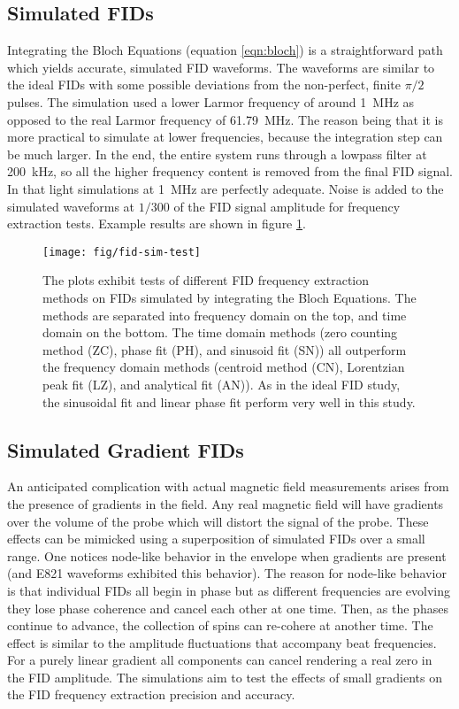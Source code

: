 \subsection{Simulated FIDs}
Integrating the Bloch Equations (equation \ref{eqn:bloch}) is a straightforward path which yields accurate, simulated FID waveforms.  The waveforms are similar to the ideal FIDs with some possible deviations from the non-perfect, finite $\pi/2$ pulses.  The simulation used a lower Larmor frequency of around \SI{1}{\MHz} as opposed to the real Larmor frequency of \SI{61.79}{\MHz}.  The reason being that it is more practical to simulate at lower frequencies, because the integration step can be much larger.  In the end, the entire system runs through a lowpass filter at \SI{200}{\kHz}, so all the higher frequency content is removed from the final FID signal.  In that light simulations at \SI{1}{\MHz} are perfectly adequate.  Noise is added to the simulated waveforms at $1/300$ of the FID signal amplitude for frequency extraction tests.  Example results are shown in figure \ref{fig:fid-sim-freq-extraction}.

\begin{figure}
\centering
\texttt{[image: fig/fid-sim-test]}
\caption{
    The plots exhibit tests of different FID frequency extraction methods on FIDs simulated by integrating the Bloch Equations.  The methods are separated into frequency domain on the top, and time domain on the bottom.  The time domain methods (zero counting method (ZC), phase fit (PH), and sinusoid fit (SN)) all outperform the frequency domain methods (centroid method (CN), Lorentzian peak fit (LZ), and analytical fit (AN)).  As in the ideal FID study, the sinusoidal fit and linear phase fit perform very well in this study.
    \label{fig:fid-sim-freq-extraction}
}
\end{figure}

\subsection{Simulated Gradient FIDs}
An anticipated complication with actual magnetic field measurements arises from the presence of gradients in the field.  Any real magnetic field will have gradients over the volume of the probe which will distort the signal of the probe.  These effects can be mimicked using a superposition of simulated FIDs over a small range.  One notices node-like behavior in the envelope when gradients are present (and E821 waveforms exhibited this behavior).  The reason for node-like behavior is that individual FIDs all begin in phase but as different frequencies are evolving they lose phase coherence and cancel each other at one time.  Then, as the phases continue to advance, the collection of spins can re-cohere at another time.  The effect is similar to the amplitude fluctuations that accompany beat frequencies.  For a purely linear gradient all components can cancel rendering a real zero in the FID amplitude.  The simulations aim to test the effects of small gradients on the FID frequency extraction precision and accuracy.

